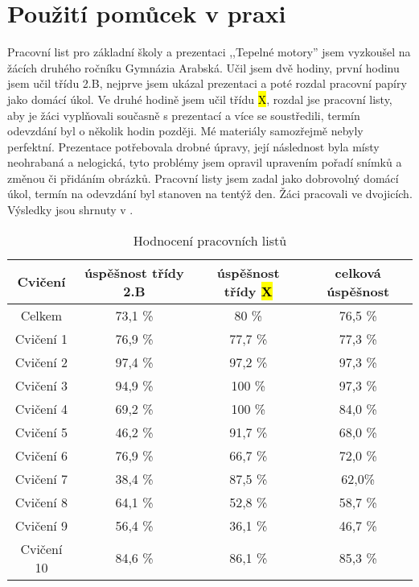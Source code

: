 \section{Použití pomůcek v praxi}
{Pracovní list pro základní školy a prezentaci ,,Tepelné motory'' jsem vyzkoušel na žácích druhého ročníku Gymnázia Arabská. Učil jsem dvě hodiny, první hodinu jsem učil třídu 2.B, nejprve jsem ukázal prezentaci a poté rozdal pracovní papíry jako domácí úkol. Ve druhé hodině jsem učil třídu \hl{X}, rozdal jse pracovní listy, aby je žáci vyplňovali současně s prezentací a více se soustředili, termín odevzdání byl o několik hodin později.}\odst
{Mé materiály samozřejmě nebyly perfektní. Prezentace potřebovala drobné úpravy, její následnost byla místy neohrabaná a nelogická, tyto problémy jsem opravil upravením pořadí snímků a změnou či přidáním obrázků.}\odst
{Pracovní listy jsem zadal jako dobrovolný domácí úkol, termín na odevzdání byl stanoven na tentýž den. Žáci pracovali ve dvojicích. Výsledky jsou shrnuty v .}
\begin{table}[h]
    \centering
    \begin{tabular}{|c|c|c|c|}
        \hline
        Cvičení & úspěšnost třídy 2.B & úspěšnost třídy \hl{X} & celková úspěšnost\\
        \hline
        Celkem & 73,1 \% & 80 \% & 76,5 \%\\
        Cvičení 1 & 76,9 \% & 77,7 \% & 77,3 \%\\
        Cvičení 2 & 97,4 \% & 97,2 \% & 97,3 \%\\
        Cvičení 3 & 94,9 \% & 100 \% & 97,3 \%\\
        Cvičení 4 & 69,2 \% & 100 \% & 84,0 \%\\
        Cvičení 5 & 46,2 \% & 91,7 \% & 68,0 \%\\
        Cvičení 6 & 76,9 \% & 66,7 \% & 72,0 \%\\
        Cvičení 7 & 38,4 \% & 87,5 \% & 62,0\%\\
        Cvičení 8 & 64,1 \% & 52,8 \% & 58,7 \%\\
        Cvičení 9 & 56,4 \% & 36,1 \% & 46,7 \%\\
        Cvičení 10 & 84,6 \% & 86,1 \% & 85,3 \%\\
        \hline
    \end{tabular}
    \caption{Hodnocení pracovních listů}
    \label{tab:vysledkyPracovnichListu}
\end{table}